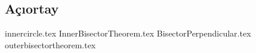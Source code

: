 \subsection{Açıortay}
{innercircle.tex}
\newpage
{InnerBisectorTheorem.tex}
\newpage
{BisectorPerpendicular.tex}
\newpage
{outerbisectortheorem.tex}
\newpage